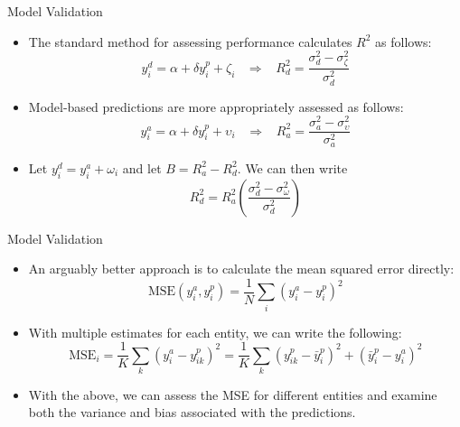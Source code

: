 \documentclass[aspectratio=169, xcolor=dvipsnames]{beamer}
\begin{document}
\begin{frame}{Model Validation}
\begin{itemize}
\item The standard method for assessing performance calculates $R^2$ as follows:
\begin{equation*}
y_i^d = \alpha + \delta y_i^p + \zeta_i \hspace{10pt} \Rightarrow
\hspace{10pt} R_d^2 = \frac{\sigma_d^2 - \sigma_\zeta^2}{\sigma_d^2}
\end{equation*}
\par\pause\noindent
\item Model-based predictions are more appropriately assessed as follows:
\begin{equation*}
y_i^a = \alpha + \delta y_i^p + \upsilon_i \hspace{10pt} \Rightarrow
\hspace{10pt} R_a^2 = \frac{\sigma_a^2 - \sigma_\upsilon^2}{\sigma_a^2}
\end{equation*}
\par\pause\noindent
\item Let $y_i^d = y_i^a + \omega_i$ and let $B = R_a^2 -  R_d^2$. We can then write
\begin{equation*}
R_d^2 = R_a^2 \left(\frac{\sigma_d^2 - \sigma_\omega^2}{\sigma_d^2} \right)
\end{equation*}
\end{itemize}
\end{frame}

\begin{frame}{Model Validation}
\begin{itemize}
\item An arguably better approach is to calculate the mean squared error directly:
\begin{equation*}
\text{MSE}(y_i^a, y_i^p) = \frac{1}{N} \sum_i (y_i^a - y_i^p)^2
\end{equation*}
\par\pause\noindent
\item With multiple estimates for each entity, we can write the following:
\begin{equation*}
\text{MSE}_i = \frac{1}{K} \sum_k (y_i^a - y_{ik}^p)^2 
=  \frac{1}{K}\sum_k (y_{ik}^p - \bar{y}_i^p)^2 + (\bar{y}_i^p - y_i^a)^2
\end{equation*}
\par\pause\noindent
\item With the above, we can assess the MSE for different entities and examine
both the variance and bias associated with the predictions.
\end{itemize}
\end{frame}
\end{document}
